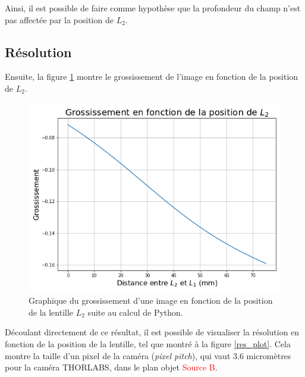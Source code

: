 \documentclass[11pt,letterpaper]{article}
\begin{document}
Ainsi, il est possible de faire comme hypothèse que la profondeur du champ n'est pas affectée
par la position de $L_2$.

\subsection{Résolution}

Ensuite, la figure \ref{gross_plot} montre le grossissement de l'image en fonction de la
position de $L_2$.

\begin{figure}[H]
  \centering
  \includegraphics[scale=0.55]{grossissement.png}
  \caption{Graphique du grossissement d'une image en fonction de la position de la lentille
  $L_2$ suite au calcul de Python.}
  \label{gross_plot}
\end{figure}

Découlant directement de ce résultat, il est possible de visualiser la résolution en fonction
de la position de la lentille, tel que montré à la figure \ref{res_plot}. Cela montre la taille
d'un pixel de la caméra (\textit{pixel pitch}), qui vaut 3.6 micromètres pour la caméra THORLABS, dans le plan objet \textcolor{red}{Source B}.

\end{document}
